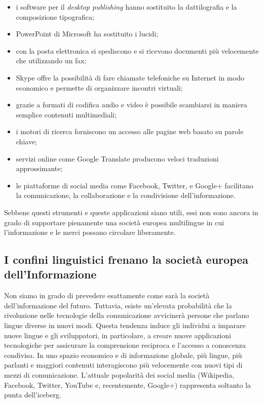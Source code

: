 \documentclass[]{../../metanetpaper}
\begin{document}
\begin{multicols}{2}
\begin{itemize}
\item i software per il \emph{desktop publishing} hanno sostituito la
  dattilografia e la composizione tipografica;
\item PowerPoint di Microsoft ha sostituito i lucidi;
\item con la posta elettronica si spediscono e si ricevono documenti pi\`{u}
  velocemente che utilizzando un fax;
\item Skype offre la possibilit\`{a} di fare chiamate telefoniche su Internet in
  modo economico e permette di organizzare incontri virtuali;
\item grazie a formati di codifica audio e video \`{e} possibile scambiarsi in
  maniera semplice contenuti multimediali;
\item i motori di ricerca forniscono un accesso alle pagine web basato su parole
  chiave;
\item servizi online come Google Translate producono veloci traduzioni
  approssimante;
\item le piattaforme di social media come Facebook, Twitter, e Google+ facilitano
  la comunicazione, la collaborazione e la condivisione dell'informazione.
\end{itemize}

Sebbene questi strumenti e queste applicazioni siano utili, essi non sono
ancora in grado di supportare pienamente una societ\`{a} europea multilingue
in cui l'informazione e le merci possano circolare liberamente.

\subsection{I confini linguistici frenano la societ\`{a} europea dell'Informazione}

Non siamo in grado di prevedere esattamente come sar\`{a} la societ\`{a} dell'informazione del futuro. Tuttavia, esiste un'elevata probabilit\`{a} che la rivoluzione nelle tecnologie della comunicazione avviciner\`{a} persone che parlano lingue diverse in nuovi modi. Questa tendenza induce gli individui a imparare nuove lingue e gli sviluppatori, in particolare, a creare nuove applicazioni tecnologiche per assicurare la comprensione reciproca e l'accesso a conoscenza condivisa. In uno spazio economico e di informazione globale, pi\`{u} lingue, pi\`{u} parlanti e maggiori contenuti interagiscono pi\`{u} velocemente con nuovi tipi di mezzi di comunicazione. L'attuale popolarit\`{a} dei social media (Wikipedia, Facebook, Twitter, YouTube e, recentemente, Google+) rappresenta soltanto la punta dell'iceberg.


\end{multicols}
\end{document}
